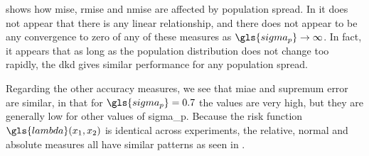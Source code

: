  shows how \gls{mise}, \gls{rmise} and \gls{nmise} are affected by population spread.
In  it does not appear that there is any linear relationship,
and there does not appear to be any convergence to zero of any of these measures as $\gls{sigma_p} \to \infty$.
In fact, it appears that as long as the population distribution does not change too rapidly,
the \gls{dkd} gives similar performance for any population \gls{spread}.

Regarding the other accuracy measures, we see that \gls{miae} and \gls{supremum error} are similar,
in that for $\gls{sigma_p} = 0.7$ the values are very high,
but they are generally low for other values of \gls{sigma_p}.
Because the risk function $\gls{lambda} \xvec$ is identical across experiments,
the relative, normal and absolute measures all have similar patterns
as seen in .

